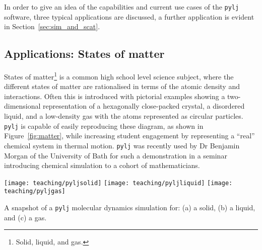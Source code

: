 In order to give an idea of the capabilities and current use cases of the \texttt{pylj} software, three typical applications are discussed, a further application is evident in Section~\ref{sec:sim_and_scat}.

\subsection{Applications: States of matter}
States of matter\footnote{Solid, liquid, and gas.} is a common high school level science subject, where the different states of matter are rationalised in terms of the atomic density and interactions.
Often this is introduced with pictorial examples showing a two-dimensional representation of a hexagonally close-packed crystal, a disordered liquid, and a low-density gas with the atoms represented as circular particles.
\texttt{pylj} is capable of easily reproducing these diagram, as shown in Figure~\ref{fig:matter}, while increasing student engagement by representing a ``real'' chemical system in thermal motion.
\texttt{pylj} was recently used by Dr Benjamin Morgan of the University of Bath for such a demonstration in a seminar introducing chemical simulation to a cohort of mathematicians.
%
\begin{marginfigure}
    \centering
    \texttt{[image: teaching/pyljsolid]}
    \texttt{[image: teaching/pyljliquid]}
    \texttt{[image: teaching/pyljgas]}
    \caption{A snapshot of a \texttt{pylj} molecular dynamics simulation for: (a) a solid, (b) a liquid, and (c) a gas.}
    \label{fig:matter}
\end{marginfigure}
%

